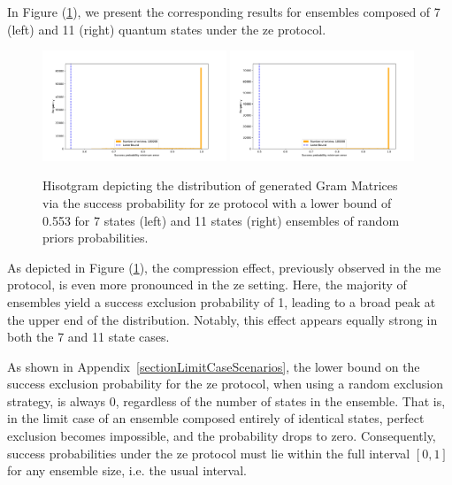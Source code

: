 \documentclass[12pt,letterpaper]{article}
\begin{document}
In Figure (\ref{FigureDistZ7Z11ZE}), we present the corresponding results for ensembles composed of 7 (left) and 11 (right) quantum states under the \gls{ze} protocol.
\begin{figure}[H]
	\centering
	\includegraphics[width=0.49\textwidth, trim={1.5cm 0.3cm 2.4cm 1.5cm}, clip]{../Plots/ExclusionZeroErrorRandomDistributionZ7Prob0.553.pdf}
	\includegraphics[width=0.49\textwidth, trim={1.5cm 0.3cm 2.4cm 1.5cm}, clip]{../Plots/ExclusionZeroErrorRandomDistributionZ11Prob0.5.pdf}
	\caption{Hisotgram depicting the distribution of generated Gram Matrices via the success probability for \gls{ze} protocol with a lower bound of 0.553 for 7 states (left) and 11 states (right) ensembles of random priors probabilities.}
	\label{FigureDistZ7Z11ZE}
\end{figure}

As depicted in Figure (\ref{FigureDistZ7Z11ZE}), the compression effect, previously observed in the \gls{me} protocol, is even more pronounced in the \gls{ze} setting. Here, the majority of ensembles yield a success exclusion probability of 1, leading to a broad peak at the upper end of the distribution. Notably, this effect appears equally strong in both the 7 and 11 state cases.

As shown in Appendix~\ref{sectionLimitCaseScenarios}, the lower bound on the success exclusion probability for the \gls{ze} protocol, when using a random exclusion strategy, is always 0, regardless of the number of states in the ensemble. That is, in the limit case of an ensemble composed entirely of identical states, perfect exclusion becomes impossible, and the probability drops to zero. Consequently, success probabilities under the \gls{ze} protocol must lie within the full interval $[0,1]$ for any ensemble size, i.e. the usual interval.
\end{document}
